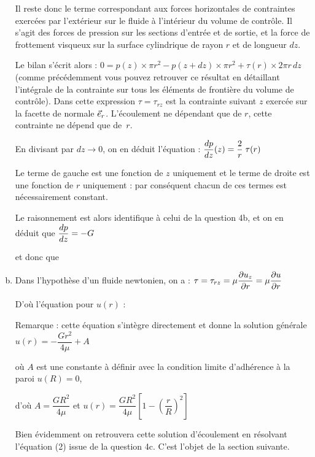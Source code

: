\documentclass[10pt, a4paper]{article}
\begin{document}
\begin{myenumerate}
\begin{enumerate}[a)]
	Il reste donc le terme correspondant aux forces horizontales de contraintes exercées par l'exté\-rieur 
	sur le fluide à l'intérieur du volume de contrôle.
	Il s'agit des forces de pression sur les sections d'entrée et de sortie, et la force de frottement
	visqueux sur la surface cylindrique de rayon $r$ et de longueur $dz$.
	
	Le bilan s'écrit alors :
	$ 0 = p(z) \times \pi r^2 - p(z+dz) \times \pi r^2 + \tau(r) \times 2\pi r\, dz$
	(comme précédemment vous pouvez 
	retrouver ce résultat en détaillant 
	l'intégrale de la contrainte sur tous les éléments de frontière du volume de contrôle).
	Dans cette expression $\tau = \tau_{rz}$ est la contrainte suivant $z$ exercée sur la facette de normale $\vec{e}_{r}$.
	L'écoulement ne dépendant que de $r$, cette contrainte ne dépend que de~$r$.
	
	En divisant par $dz\rightarrow 0$, on en déduit l'équation : \qquad
	$\displaystyle \frac{d p}{dz}(z) = \displaystyle \frac{2}{r} \; \tau(r)$
	
	\medskip
	Le terme de gauche est une fonction de $z$ uniquement et le terme de droite est une fonction de $r$ uniquement : 
	par conséquent chacun de ces termes est nécessairement constant.
	
	\medskip
	Le raisonnement est alors identifique à celui de la question 4b, et on en déduit que $\displaystyle \frac{d p}{dz} = -G$
	
	\medskip
	et donc que 
	\dotfill
	
\medskip
\item
	Dans l'hypothèse d'un fluide newtonien, on a : \quad $\tau = \tau_{rz} = \mu \displaystyle \frac{\partial u_z}{\partial r} = \mu \displaystyle \frac{\partial u}{\partial r}$
	
	D'où l'équation pour $u(r)$ : 
	\dotfill

\medskip
Remarque : cette équation s'intègre directement et donne la solution générale $u(r) = -\dfrac{Gr^2}{4\mu} + A$

\smallskip
où $A$ est une constante à définir avec la condition limite d'adhérence à la paroi $u(R) = 0$,

\smallskip
d'où $A = \dfrac{GR^2}{4\mu}$ et
\dotfill $u(r) = \dfrac{GR^2}{4\mu} \left [ 1 - \left (  \dfrac{r}{R} \right)^2 \right ]$

\medskip
Bien évidemment on retrouvera cette solution d'écoulement en résolvant l'équation (2) issue de la question 4c.
C'est l'objet de la section suivante.

\end{enumerate}
\end{myenumerate}
\end{document}
